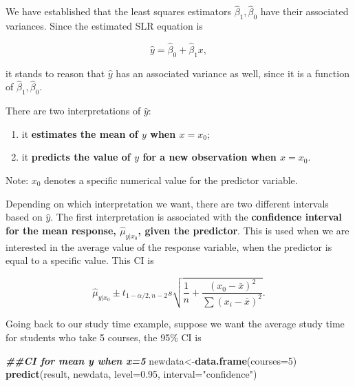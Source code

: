 \documentclass[
]{book}
\newenvironment{Shaded}{\begin{snugshade}}{\end{snugshade}}
\newcommand{\AttributeTok}[1]{\textcolor[rgb]{0.13,0.29,0.53}{#1}}
\newcommand{\DecValTok}[1]{\textcolor[rgb]{0.00,0.00,0.81}{#1}}
\newcommand{\DocumentationTok}[1]{\textcolor[rgb]{0.56,0.35,0.01}{\textbf{\textit{#1}}}}
\newcommand{\FloatTok}[1]{\textcolor[rgb]{0.00,0.00,0.81}{#1}}
\newcommand{\FunctionTok}[1]{\textcolor[rgb]{0.13,0.29,0.53}{\textbf{#1}}}
\newcommand{\NormalTok}[1]{#1}
\newcommand{\OtherTok}[1]{\textcolor[rgb]{0.56,0.35,0.01}{#1}}
\newcommand{\StringTok}[1]{\textcolor[rgb]{0.31,0.60,0.02}{#1}}
\providecommand{\tightlist}{%
  \setlength{\itemsep}{0pt}\setlength{\parskip}{0pt}}
\begin{document}
We have established that the least squares estimators \(\hat{\beta}_1,\hat{\beta}_0\) have their associated variances. Since the estimated SLR equation is

\begin{equation} 
\hat{y}=\hat{\beta}_0+\hat{\beta}_1 x,
\label{eq:4fitted}
\end{equation}

it stands to reason that \(\hat{y}\) has an associated variance as well, since it is a function of \(\hat{\beta}_1,\hat{\beta}_0\).

There are two interpretations of \(\hat{y}\):

\begin{enumerate}
\def\labelenumi{\arabic{enumi}.}
\tightlist
\item
  it \textbf{estimates the mean of \(y\) when \(x=x_0\)};
\item
  it \textbf{predicts the value of \(y\) for a new observation when \(x=x_0\)}.
\end{enumerate}

Note: \(x_0\) denotes a specific numerical value for the predictor variable.

Depending on which interpretation we want, there are two different intervals based on \(\hat{y}\). The first interpretation is associated with the \textbf{confidence interval for the mean response, \(\hat{\mu}_{y|x_0}\), given the predictor}. This is used when we are interested in the average value of the response variable, when the predictor is equal to a specific value. This CI is

\begin{equation} 
\hat{\mu}_{y|x_0}\pm t_{1-\alpha/2,n-2}s\sqrt{\frac{1}{n} +
\frac{(x_0-\bar{x})^2}{\sum(x_i-\bar{x})^2}}.
\label{eq:4CImean}
\end{equation}

Going back to our study time example, suppose we want the average study time for students who take 5 courses, the 95\% CI is

\begin{Shaded}
\begin{Highlighting}[]
\DocumentationTok{\#\#CI for mean y when x=5}
\NormalTok{newdata}\OtherTok{\textless{}{-}}\FunctionTok{data.frame}\NormalTok{(}\AttributeTok{courses=}\DecValTok{5}\NormalTok{)}
\FunctionTok{predict}\NormalTok{(result, newdata, }\AttributeTok{level=}\FloatTok{0.95}\NormalTok{, }\AttributeTok{interval=}\StringTok{"confidence"}\NormalTok{)}
\end{Highlighting}
\end{Shaded}
\end{document}
